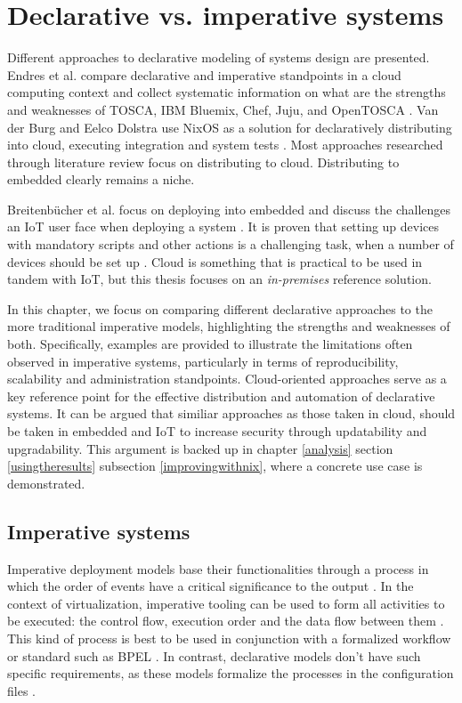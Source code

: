 \chapter{Declarative vs. imperative systems} \label{imperative}

Different approaches to declarative modeling of
systems design are presented. Endres et al. compare declarative and imperative
standpoints in a cloud computing context and collect systematic
information on what are the strengths and weaknesses of TOSCA, IBM
Bluemix, Chef, Juju, and OpenTOSCA \cite{endres2017declarative}. Van
der Burg and Eelco Dolstra use NixOS as a solution for declaratively
distributing into cloud, executing integration and system tests
\cite{van2010declarative}. Most approaches researched through
literature review focus on distributing to cloud. Distributing to
embedded clearly remains a niche.

Breitenbücher et al. focus on deploying into embedded and discuss
the challenges an IoT user face when deploying a system \cite{breitenbucher2017declarative}. It is proven
that setting up devices with mandatory scripts and other actions is a
challenging task, when a number of devices should be set up \cite{breitenbucher2017declarative}. Cloud is
something that is practical to be used in tandem with IoT, but this thesis
focuses on an \textit{in-premises} reference
solution. 

In this chapter, we focus on comparing different declarative
approaches to the more traditional imperative models, highlighting the
strengths and weaknesses of both. Specifically, examples are provided
to illustrate the limitations often observed in imperative systems,
particularly in terms of reproducibility, scalability and
administration standpoints. Cloud-oriented approaches serve as a key
reference point for the effective distribution and automation of
declarative systems. It can be argued that similiar approaches as
those taken in cloud, should be taken in embedded and IoT to increase
security through updatability and upgradability. This argument is backed up
in chapter \ref{analysis} section \ref{usingtheresults}
subsection \ref{improvingwithnix}, where a concrete use case is demonstrated.

\section{Imperative systems}

Imperative deployment models base their functionalities through a
process in which the order of events have a critical significance to
the output \cite{breitenbucher2017declarative}. In the context of
virtualization, imperative tooling can be used to form all
activities to be executed: the control flow, execution order
and the data flow between them \cite{endres2017declarative}. This kind
of process is best to be used in conjunction with a formalized
workflow or standard such as BPEL \cite{endres2017declarative}. In
contrast, declarative models don't have such specific requirements, as
these models formalize the processes in the configuration files
\cite{endres2017declarative}.

